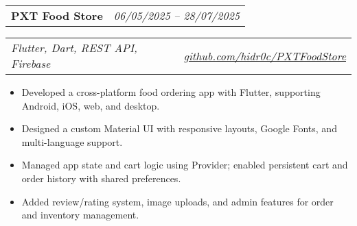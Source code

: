 \documentclass[a4paper,11pt]{article}
\begin{document}
\begin{spacing}{1.05}
\begin{minipage}[t]{\linewidth}
  \begin{tabularx}{\linewidth}{@{}l r@{}}
    \textbf{PXT Food Store} & \hspace*{0.63\linewidth}\normalsize\textit{06/05/2025 – 28/07/2025} \\
  \end{tabularx}
  \begin{tabularx}{\linewidth}{@{}l r@{}}
  \normalsize\textit{Flutter, Dart, REST API, Firebase} & \hspace*{0.405\linewidth}\href{https://github.com/hidr0c/PXTFoodStore}{\normalsize\textit{github.com/hidr0c/PXTFoodStore}}\\
  \end{tabularx}
 \begin{itemize} [nosep,leftmargin=1.2em,itemsep=2pt]
  \item Developed a cross-platform food ordering app with Flutter, supporting Android, iOS, web, and desktop.
  \item Designed a custom Material UI with responsive layouts, Google Fonts, and multi-language support.
  \item Managed app state and cart logic using Provider; enabled persistent cart and order history with shared preferences.
  \item Added review/rating system, image uploads, and admin features for order and inventory management. 
  \\
\end{itemize}



  
\end{minipage}
\end{spacing}

\end{document}
